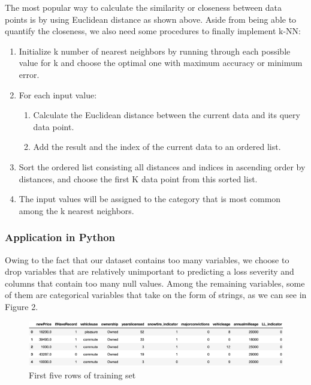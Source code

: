 \documentclass[12pt]{article} %
\theoremstyle{definition}
\begin{document}
The most popular way to calculate the similarity or closeness between data points is by using Euclidean distance as shown above. Aside from being able to quantify the closeness, we also need some procedures to finally implement k-NN: \cite{knn3}

\renewcommand{\labelenumii}{\roman{enumii}}
\begin{enumerate}
    \item Initialize k number of nearest neighbors by running through each possible value for k and choose the optimal one with maximum accuracy or minimum error.
    \item For each input value:
        \begin{enumerate}
            \item Calculate the Euclidean distance between the current data and its query data point.
            \item Add the result and the index of the current data to an ordered list.
        \end{enumerate}
    \item Sort the ordered list consisting all distances and indices in ascending order by distances, and choose the first K data point from this sorted list.
    \item The input values will be assigned to the category that is most common among the k nearest neighbors.
\end{enumerate}

\subsubsection{Application in Python}
Owing to the fact that our dataset contains too many variables, we choose to drop variables that are relatively unimportant to predicting a loss severity and columns that contain too many null values. Among the remaining variables, some of them are categorical variables that take on the form of strings, as we can see in Figure 2.

\begin{figure}[h!]
    \centering
    \includegraphics[width=0.9\linewidth]{KNN/trainSet.png}
    \caption{First five rows of training set}
\end{figure}
\end{document}
